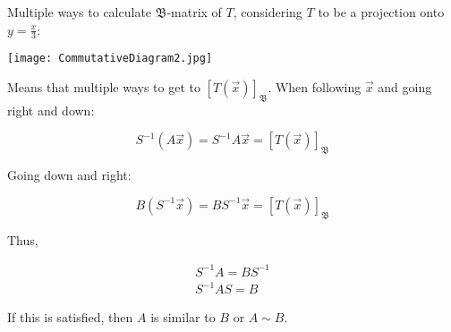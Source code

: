 \noindent
Multiple ways to calculate $\mathfrak{B}$-matrix of $T$, considering $T$ to be a projection
onto $y=\frac{x}{3}$:

\texttt{[image: CommutativeDiagram2.jpg]}

Means that multiple ways to get to $[T(\vec{x})]_\mathfrak{B}$.
When following $\vec{x}$ and going right and down:

\[S^{-1}\left(A\vec x\right)=S^{-1}A\vec x=\left[T(\vec x) \right]_\mathfrak{B}\]

Going down and right:

\[B\left(S^{-1}\vec x\right)=BS^{-1} \vec x=\left[T(\vec x )\right]_\mathfrak{B}\]

Thus,

\begin{align*}
S^{-1}A=BS^{-1}\\
\boxed{S^{-1}AS=B}
\end{align*}

If this is satisfied, then $A$ is similar to $B$ or $A\sim B$.